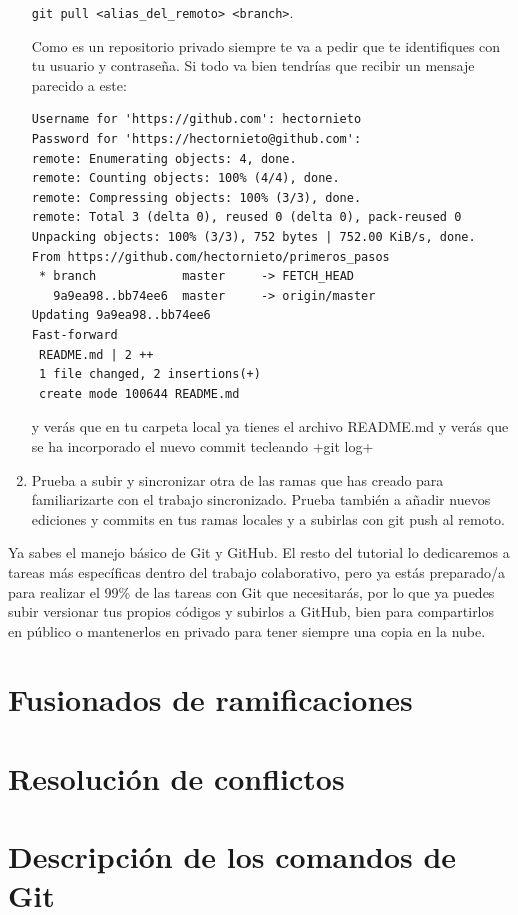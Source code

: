 \documentclass[a4paper,10pt]{article}
\begin{document}
\begin{enumerate}
      \verb+git pull <alias_del_remoto> <branch>+. 
      
      Como es un repositorio privado siempre te va a pedir que te identifiques con tu usuario y contraseña. Si todo va bien tendrías que recibir un mensaje parecido a este:
      
      \begin{lstlisting}[style=custom]
Username for 'https://github.com': hectornieto
Password for 'https://hectornieto@github.com': 
remote: Enumerating objects: 4, done.
remote: Counting objects: 100% (4/4), done.
remote: Compressing objects: 100% (3/3), done.
remote: Total 3 (delta 0), reused 0 (delta 0), pack-reused 0
Unpacking objects: 100% (3/3), 752 bytes | 752.00 KiB/s, done.
From https://github.com/hectornieto/primeros_pasos
 * branch            master     -> FETCH_HEAD
   9a9ea98..bb74ee6  master     -> origin/master
Updating 9a9ea98..bb74ee6
Fast-forward
 README.md | 2 ++
 1 file changed, 2 insertions(+)
 create mode 100644 README.md
      \end{lstlisting}
      y verás que en tu carpeta local ya tienes el archivo README.md y verás que se ha incorporado el nuevo commit tecleando \cverb+git log+
      
      \item Prueba a subir y sincronizar otra de las ramas que has creado para familiarizarte con el trabajo sincronizado. Prueba también a añadir nuevos ediciones y commits en tus ramas locales y a subirlas con git push al remoto.
    \end{enumerate}
    
    Ya sabes el manejo básico de Git y GitHub. El resto del tutorial lo dedicaremos a tareas más específicas dentro del trabajo colaborativo, pero ya estás preparado/a para realizar el 99\% de las tareas con Git que necesitarás, por lo que ya puedes subir versionar tus propios códigos  y subirlos a GitHub, bien para compartirlos en público o mantenerlos en privado para tener siempre una copia en la nube.
  
  \section{Fusionados de ramificaciones}
  
  \section{Resolución de conflictos}


  \section{Descripción de los comandos de Git}
\end{document}

